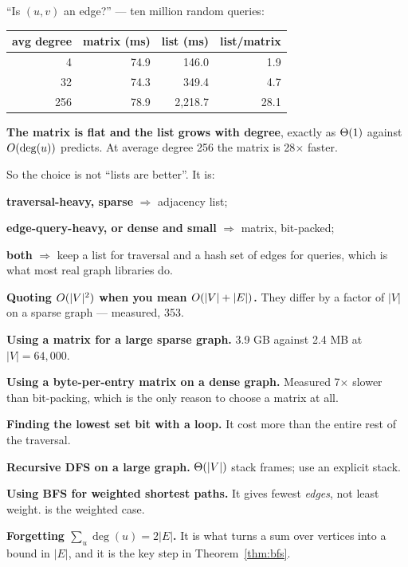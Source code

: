 \begin{worked}
``Is $(u,v)$ an edge?'' --- ten million random queries:

\begin{center}
\begin{tabular}{@{}rrrr@{}}
\toprule
\rowcolor{primary!15}
avg degree & matrix (ms) & list (ms) & list/matrix \\
\midrule
  4 & 74.9 &   146.0 &  1.9 \\
 32 & 74.3 &   349.4 &  4.7 \\
256 & 78.9 & 2{,}218.7 & 28.1 \\
\bottomrule
\end{tabular}
\end{center}

\smallskip
\textbf{The matrix is flat and the list grows with degree}, exactly as
$\Theta(1)$ against $O(\deg(u))$ predicts. At average degree 256 the matrix
is 28$\times$ faster.

\smallskip
So the choice is not ``lists are better''. It is:
\begin{tight}
  \item \textbf{traversal-heavy, sparse} $\Rightarrow$ adjacency list;
  \item \textbf{edge-query-heavy, or dense and small} $\Rightarrow$ matrix,
        bit-packed;
  \item \textbf{both} $\Rightarrow$ keep a list for traversal and a hash set of
        edges for queries, which is what most real graph libraries do.
\end{tight}
\end{worked}

\begin{pitfall}
\begin{tight}
  \item \textbf{Quoting $O(|V|^{2})$ when you mean $O(|V|+|E|)$.} They
        differ by a factor of $|V|$ on a sparse graph --- measured, 353.
  \item \textbf{Using a matrix for a large sparse graph.} 3.9 GB against 2.4 MB
        at $|V| = 64{,}000$.
  \item \textbf{Using a byte-per-entry matrix on a dense graph.} Measured
        7$\times$ slower than bit-packing, which is the only reason to choose a
        matrix at all.
  \item \textbf{Finding the lowest set bit with a loop.} It cost more than the
        entire rest of the traversal.
  \item \textbf{Recursive DFS on a large graph.} $\Theta(|V|)$ stack frames; use
        an explicit stack.
  \item \textbf{Using BFS for weighted shortest paths.} It gives fewest
        \emph{edges}, not least weight.  is the weighted
        case.
  \item \textbf{Forgetting $\sum_{u}\deg(u) = 2|E|$.} It is what turns a sum
        over vertices into a bound in $|E|$, and it is the key step in
        Theorem~\ref{thm:bfs}.
\end{tight}
\end{pitfall}

